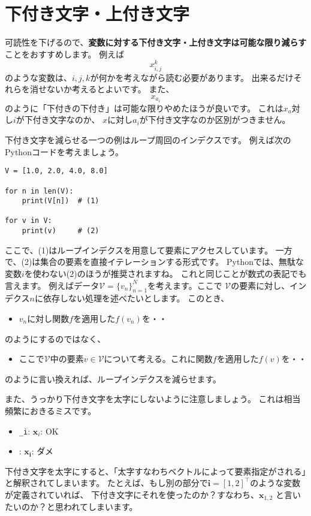 \documentclass[uplatex,twocolumn,9pt,dvipdfmx]{jsarticle}
\begin{document}
\section{下付き文字・上付き文字}
可読性を下げるので、\textbf{変数に対する下付き文字・上付き文字は可能な限り減らす}ことをおすすめします。
例えば
\begin{equation}
    x_{i, j}^k
\end{equation}
のような変数は、$i, j, k$が何かを考えながら読む必要があります。
出来るだけそれらを消せないか考えるとよいです。
また、
\begin{equation}
    x_{a_i}
\end{equation}
のように「下付きの下付き」は可能な限りやめたほうが良いです。
これは$x_a$対し$i$が下付き文字なのか、
$x$に対し$a_i$が下付き文字なのか区別がつきません。

下付き文字を減らせる一つの例はループ周回のインデクスです。
例えば次のPythonコードを考えましょう。
\begin{verbatim}
V = [1.0, 2.0, 4.0, 8.0]

for n in len(V):
    print(V[n])  # (1)

for v in V:
    print(v)     # (2)
\end{verbatim}
ここで、(1)はループインデクスを用意して要素にアクセスしています。
一方で、(2)は集合の要素を直接イテレーションする形式です。
Pythonでは、無駄な変数$i$を使わない(2)のほうが推奨されますね。
これと同じことが数式の表記でも言えます。
例えばデータ$\mathcal{V} = \{v_n\}_{n=1}^N$を考えます。ここで
$\mathcal{V}$の要素に対し、インデクス$n$に依存しない処理を述べたいとします。
このとき、
\begin{itemize}
\item $v_n$に対し関数$f$を適用した$f(v_n)$を・・
\end{itemize}
のようにするのではなく、
\begin{itemize}
\item ここで$\mathcal{V}$中の要素$v \in \mathcal{V}$について考える。これに関数$f$を適用した$f(v)$を・・
\end{itemize}
のように言い換えれば、ループインデクスを減らせます。

また、うっかり下付き文字を太字にしないように注意しましょう。
これは相当頻繁におきるミスです。
\begin{itemize}
    \item \texttt{_i}: $\mathbf{x}_i$: OK
    \item \texttt{}: $\mathbf{x_i}$: ダメ
\end{itemize}
下付き文字を太字にすると、「太字すなわちベクトルによって要素指定がされる」と解釈されてしまいます。
たとえば、もし別の部分で$\mathbf{i}=[1, 2]^\top$のような変数が定義されていれば、
下付き文字にそれを使ったのか？すなわち、$\mathbf{x}_{1, 2}$
と言いたいのか？と思われてしまいます。
\end{document}
